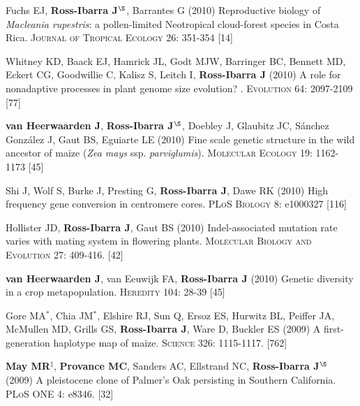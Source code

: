\documentclass[letterpaper,10pt]{article}
\begin{document}
\begin{etaremune}
\item Fuchs EJ, {\bf Ross-Ibarra J}$^\S$, Barrantes G (2010) Reproductive biology of \emph{Macleania rupestris}: a pollen-limited Neotropical cloud-forest species in Costa Rica.  \textsc{Journal of Tropical Ecology} 26: 351-354
 [14]\\


\item Whitney KD, Baack EJ, Hamrick JL, Godt MJW, Barringer BC, Bennett MD, Eckert CG, Goodwillie C, Kalisz S, Leitch I, {\bf Ross-Ibarra J} (2010) A role for nonadaptive processes in plant genome size evolution? . \textsc{Evolution} 64: 2097-2109
 [77]\\


\item {\bf van Heerwaarden J}, {\bf Ross-Ibarra J}$^\S$, Doebley J, Glaubitz JC, S\'{a}nchez Gonz\'{a}lez J, Gaut BS, Eguiarte LE (2010) Fine scale genetic structure in the wild ancestor of maize (\emph{Zea mays} ssp. \emph{parviglumis}).  \textsc{Molecular Ecology} 19: 1162-1173
 [45]\\


\item Shi J, Wolf S, Burke J, Presting G, {\bf Ross-Ibarra J}, Dawe RK (2010) High frequency gene conversion in centromere cores.  \textsc{PLoS Biology} 8: e1000327
 [116]\\


\item Hollister JD, {\bf Ross-Ibarra J}, Gaut BS (2010) Indel-associated mutation rate varies with mating system in flowering plants.  \textsc{Molecular Biology and Evolution} 27: 409-416.
 [42]\\

\item {\bf van Heerwaarden J}, van Eeuwijk FA, {\bf Ross-Ibarra J} (2010) Genetic diversity in a crop metapopulation.  \textsc{Heredity} 104: 28-39
 [45]\\


\item Gore MA$^*$, Chia JM$^*$, Elshire RJ, Sun Q, Ersoz ES, Hurwitz BL, Peiffer JA, McMullen MD, Grills GS, {\bf Ross-Ibarra J}, Ware D, Buckler ES (2009) A first-generation haplotype map of maize.  \textsc{Science 326}: 1115-1117.
 [762]\\


\item {\bf May MR}$^\ddagger$, {\bf Provance MC}, Sanders AC, Ellstrand NC, {\bf Ross-Ibarra J}$^\S$ (2009) A pleistocene clone of Palmer's Oak persisting in Southern California.  \textsc{PLoS ONE} 4: e8346.
 [32]\\



\end{etaremune}
\end{document}
